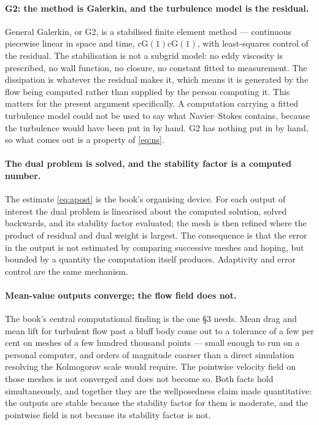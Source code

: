 \documentclass[11pt]{article}
\begin{document}
\paragraph{G2: the method is Galerkin, and the turbulence model is the residual.} General Galerkin,
or G2, is a stabilised finite element method --- continuous piecewise linear in space and time,
$\mathrm{cG}(1)\mathrm{cG}(1)$, with least-squares control of the residual. The stabilisation is not
a subgrid model: no eddy viscosity is prescribed, no wall function, no closure, no constant fitted
to measurement. The dissipation is whatever the residual makes it, which means it is generated by
the flow being computed rather than supplied by the person computing it. This matters for the
present argument specifically. A computation carrying a fitted turbulence model could not be used to
say what Navier--Stokes contains, because the turbulence would have been put in by hand. G2 has
nothing put in by hand, so what comes out is a property of \eqref{eq:ns}.

\paragraph{The dual problem is solved, and the stability factor is a computed number.} The estimate
\eqref{eq:apost} is the book's organising device. For each output of interest the dual problem is
linearised about the computed solution, solved backwards, and its stability factor evaluated; the
mesh is then refined where the product of residual and dual weight is largest. The consequence is
that the error in the output is not estimated by comparing successive meshes and hoping, but bounded
by a quantity the computation itself produces. Adaptivity and error control are the same mechanism.

\paragraph{Mean-value outputs converge; the flow field does not.} The book's central computational
finding is the one \S3 needs. Mean drag and mean lift for turbulent flow past a bluff body come out
to a tolerance of a few per cent on meshes of a few hundred thousand points --- small enough to run
on a personal computer, and orders of magnitude coarser than a direct simulation resolving the
Kolmogorov scale would require. The pointwise velocity field on those meshes is not converged and
does not become so. Both facts hold simultaneously, and together they are the wellposedness claim
made quantitative: the outputs are stable because the stability factor for them is moderate, and the
pointwise field is not because its stability factor is not.
\end{document}
